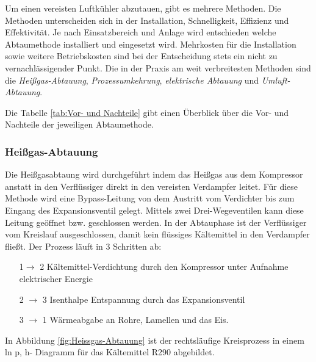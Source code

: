 Um einen vereisten Luftkühler abzutauen, gibt es mehrere Methoden. Die Methoden unterscheiden sich in der Installation, Schnelligkeit, Effizienz und Effektivität. Je nach Einsatzbereich und Anlage wird entschieden welche Abtaumethode installiert und eingesetzt wird. Mehrkosten für die Installation sowie weitere Betriebskosten sind bei der Entscheidung stets ein nicht zu vernachlässigender Punkt.
Die in der Praxis am weit verbreitesten Methoden sind  die \textit{Heißgas-Abtauung}, \textit{Prozessumkehrung}, \textit{elektrische Abtauung} und \textit{Umluft-Abtauung}.

Die Tabelle \ref{tab:Vor- und Nachteile} gibt einen Überblick über die Vor- und Nachteile der jeweiligen Abtaumethode. 

\subsubsection*{Heißgas-Abtauung}

Die Heißgasabtaung wird durchgeführt indem das Heißgas aus dem Kompressor anstatt in den Verflüssiger direkt in den vereisten Verdampfer leitet. Für diese Methode wird eine Bypass-Leitung von dem Austritt vom Verdichter bis zum Eingang des Expansionsventil gelegt. Mittels zwei Drei-Wegeventilen kann diese Leitung geöffnet bzw. geschlossen werden. In der Abtauphase ist der Verflüssiger vom Kreislauf ausgeschlossen, damit kein flüssiges Kältemittel in den Verdampfer fließt. \citep{Baehr2013}
Der Prozess läuft in 3 Schritten ab:

\begin{itemize}
\item[1$\longrightarrow$ 2] Kältemittel-Verdichtung durch den Kompressor unter Aufnahme elektrischer Energie

\item[2 $\longrightarrow$ 3] Isenthalpe Entspannung durch das Expansionsventil

\item[3 $\longrightarrow$ 1] Wärmeabgabe an Rohre, Lamellen und das Eis. 
\end{itemize}


In Abbildung \ref{fig:Heissgas-Abtauung} ist der rechtsläufige Kreisprozess in einem ln p, h- Diagramm für das Kältemittel R290 abgebildet. 


